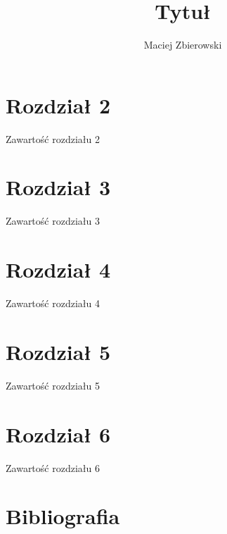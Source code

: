 \documentclass[11pt, a4paper]{article}
\author{Maciej Zbierowski}
\title{Tytuł}
\begin{document}
	\maketitle
	\tableofcontents
	\newpage
	
		
	
	\newpage
	
	\section{Rozdział 2}
	Zawartość rozdziału 2
	
	\newpage
	
	\section{Rozdział 3}
	Zawartość rozdziału 3
	
	\newpage
	
	\section{Rozdział 4}
	Zawartość rozdziału 4
	
	\newpage

	\section{Rozdział 5}
	Zawartość rozdziału 5
	
	\newpage
	
	\section{Rozdział 6}
	Zawartość rozdziału 6
	
	\newpage
	
	\section{Bibliografia}
	\begin{thebibliography}{2}
	
	\end{thebibliography}
\end{document}
